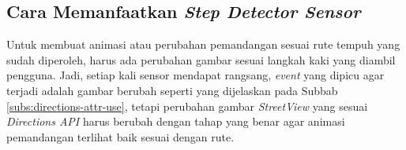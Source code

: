  




\subsection{Cara Memanfaatkan \textit{Step Detector Sensor}}
Untuk membuat animasi atau perubahan pemandangan sesuai rute tempuh yang sudah diperoleh, harus ada perubahan gambar sesuai langkah kaki yang diambil pengguna. Jadi, setiap kali sensor mendapat rangsang, \textit{event} yang dipicu agar terjadi adalah gambar berubah seperti yang dijelaskan pada Subbab \ref{subs:directions-attr-use}, tetapi perubahan gambar \textit{StreetView} yang sesuai \textit{Directions API} harus berubah dengan tahap yang benar agar animasi pemandangan terlihat baik sesuai dengan rute. 